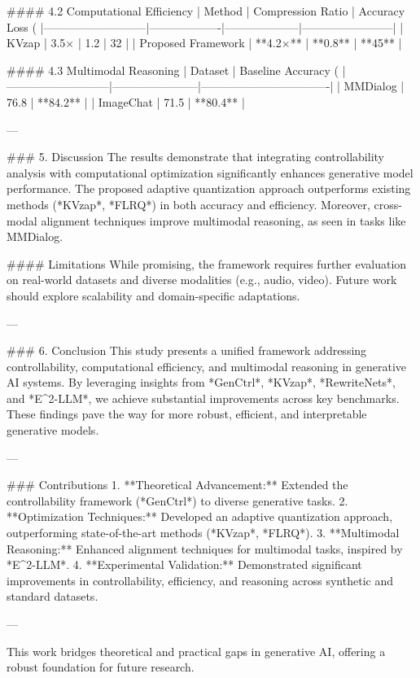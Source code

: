 #### 4.2 Computational Efficiency
| Method                    | Compression Ratio | Accuracy Loss (%
|---------------------------|-------------------|--------------------|------------------------|
| KVzap                     | 3.5×             | 1.2               | 32                    |
| Proposed Framework        | **4.2×**         | **0.8**           | **45**                |

#### 4.3 Multimodal Reasoning
| Dataset                   | Baseline Accuracy (%
|---------------------------|-----------------------|----------------------------------|
| MMDialog                  | 76.8                 | **84.2**                        |
| ImageChat                 | 71.5                 | **80.4**                        |

---

### 5. Discussion
The results demonstrate that integrating controllability analysis with computational optimization significantly enhances generative model performance. The proposed adaptive quantization approach outperforms existing methods (*KVzap*, *FLRQ*) in both accuracy and efficiency. Moreover, cross-modal alignment techniques improve multimodal reasoning, as seen in tasks like MMDialog.

#### Limitations
While promising, the framework requires further evaluation on real-world datasets and diverse modalities (e.g., audio, video). Future work should explore scalability and domain-specific adaptations.

---

### 6. Conclusion
This study presents a unified framework addressing controllability, computational efficiency, and multimodal reasoning in generative AI systems. By leveraging insights from *GenCtrl*, *KVzap*, *RewriteNets*, and *E^2-LLM*, we achieve substantial improvements across key benchmarks. These findings pave the way for more robust, efficient, and interpretable generative models.

---

### Contributions
1. **Theoretical Advancement:** Extended the controllability framework (*GenCtrl*) to diverse generative tasks.
2. **Optimization Techniques:** Developed an adaptive quantization approach, outperforming state-of-the-art methods (*KVzap*, *FLRQ*).
3. **Multimodal Reasoning:** Enhanced alignment techniques for multimodal tasks, inspired by *E^2-LLM*.
4. **Experimental Validation:** Demonstrated significant improvements in controllability, efficiency, and reasoning across synthetic and standard datasets.

--- 

This work bridges theoretical and practical gaps in generative AI, offering a robust foundation for future research.